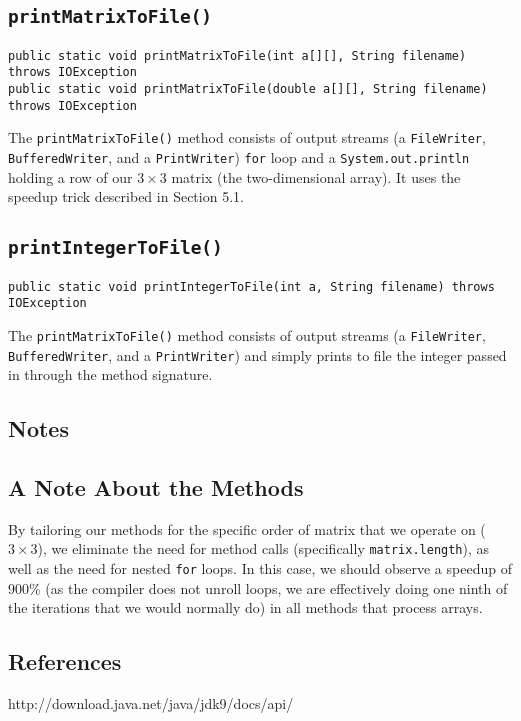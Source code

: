 \documentclass[12pt]{article}
\begin{document}
\subsection{\texttt{printMatrixToFile()}}
\begin{verbatim}
public static void printMatrixToFile(int a[][], String filename) throws IOException
public static void printMatrixToFile(double a[][], String filename) throws IOException
\end{verbatim}
The \texttt{printMatrixToFile()} method consists of output streams (a \texttt{FileWriter}, \texttt{BufferedWriter}, and a \texttt{PrintWriter}) \texttt{for} loop and a \texttt{System.out.println} holding a row of our $3\times3$ matrix (the two-dimensional array). It uses the speedup trick described in Section 5.1.

\subsection{\texttt{printIntegerToFile()}}
\begin{verbatim}
public static void printIntegerToFile(int a, String filename) throws IOException
\end{verbatim}
The \texttt{printMatrixToFile()} method consists of output streams (a \texttt{FileWriter}, \texttt{BufferedWriter}, and a \texttt{PrintWriter}) and simply prints to file the integer passed in through the method signature.



\newpage %



\begin{center}
\section{Notes}
\end{center}
\subsection{A Note About the Methods}
By tailoring our methods for the specific order of matrix that we operate on ($3\times3$), we eliminate the need for method calls (specifically \texttt{matrix.length}), as well as the need for nested \texttt{for} loops. In this case, we should observe a speedup of 900\% (as the compiler does not unroll loops, we are effectively doing one ninth of the iterations that we would normally do) in all methods that process arrays.



\newpage %



\begin{center}
\section*{References}
\end{center}
http://download.java.net/java/jdk9/docs/api/
\end{document}
